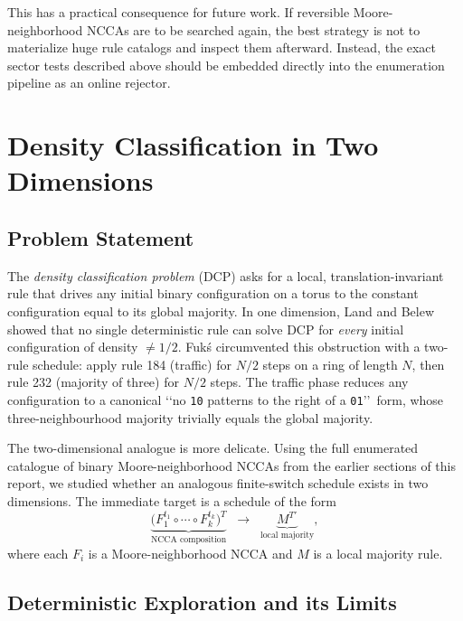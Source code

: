 \documentclass[11pt,a4paper]{article}
\begin{document}
This has a practical consequence for future work.  If reversible Moore-neighborhood NCCAs are
to be searched again, the best strategy is not to materialize huge rule catalogs and inspect
them afterward.  Instead, the exact sector tests described above should be embedded directly
into the enumeration pipeline as an online rejector.

\section{Density Classification in Two Dimensions}
\label{sec:dcp}

\subsection{Problem Statement}

The \emph{density classification problem} (DCP) asks for a local,
translation-invariant rule that drives any initial binary configuration on a
torus to the constant configuration equal to its global majority.  In one
dimension, Land and Belew \cite{LandBelew1995} showed that no single
deterministic rule can solve DCP for \emph{every} initial configuration of
density \(\neq 1/2\).  Fuk\'{s} \cite{Fuks1997} circumvented this obstruction
with a two-rule schedule: apply rule 184 (traffic) for \(N/2\) steps on a
ring of length \(N\), then rule 232 (majority of three) for \(N/2\) steps.
The traffic phase reduces any configuration to a canonical \lq\lq no
\texttt{10} patterns to the right of a \texttt{01}\rq\rq\ form, whose
three-neighbourhood majority trivially equals the global majority.

The two-dimensional analogue is more delicate.  Using the full enumerated
catalogue of binary Moore-neighborhood NCCAs from the earlier sections of
this report, we studied whether an analogous finite-switch schedule exists in
two dimensions.  The immediate target is a schedule of the form
\[
\underbrace{\bigl(F_1^{t_1}\circ\cdots\circ F_k^{t_k}\bigr)^T}_{\text{NCCA composition}}
\;\;\longrightarrow\;\;
\underbrace{M^{T'}}_{\text{local majority}},
\]
where each \(F_i\) is a Moore-neighborhood NCCA and \(M\) is a local majority
rule.

\subsection{Deterministic Exploration and its Limits}
\end{document}
